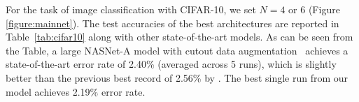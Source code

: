 
For the task of image classification with CIFAR-10, we set $N=4$ or 6 (Figure \ref{figure:mainnet}). The test accuracies of the best architectures are reported in Table~\ref{tab:cifar10} along with other state-of-the-art models. As can be seen from the Table, a large NASNet-A model with cutout data augmentation~\cite{devries2017improved} achieves a state-of-the-art error rate of 2.40\% (averaged across 5 runs), which is slightly better than the previous best record of 2.56\% by \cite{devries2017improved}. The best single run from our model achieves 2.19\% error rate.

